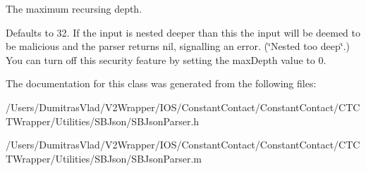 The maximum recursing depth. 

Defaults to 32. If the input is nested deeper than this the input will be deemed to be malicious and the parser returns nil, signalling an error. (\char`\"{}\-Nested too deep\char`\"{}.) You can turn off this security feature by setting the max\-Depth value to 0. 

The documentation for this class was generated from the following files\-:\begin{DoxyCompactItemize}
\item 
/\-Users/\-Dumitras\-Vlad/\-V2\-Wrapper/\-I\-O\-S/\-Constant\-Contact/\-Constant\-Contact/\-C\-T\-C\-T\-Wrapper/\-Utilities/\-S\-B\-Json/S\-B\-Json\-Parser.\-h\item 
/\-Users/\-Dumitras\-Vlad/\-V2\-Wrapper/\-I\-O\-S/\-Constant\-Contact/\-Constant\-Contact/\-C\-T\-C\-T\-Wrapper/\-Utilities/\-S\-B\-Json/S\-B\-Json\-Parser.\-m\end{DoxyCompactItemize}
